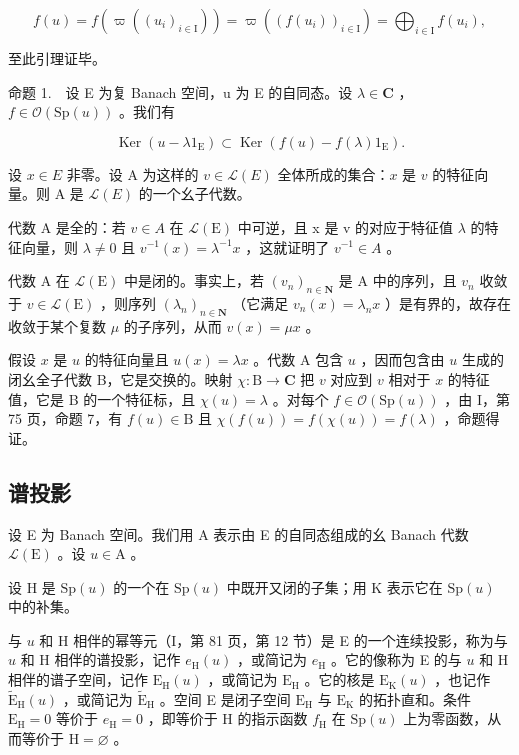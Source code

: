 \[
f (u) = f (\varpi ((u _ {i}) _ {i \in \mathrm{I}})) = \varpi ((f (u _ {i})) _ {i \in \mathrm{I}}) = \bigoplus_ {i \in \mathrm{I}} f (u _ {i}),
\]

至此引理证毕。

命题 1.　设 E 为复 Banach 空间，u 为 E 的自同态。设 \(\lambda \in \mathbf{C}\) ，\(f \in \mathcal{O}(\mathrm{Sp}(u))\) 。我们有

\[
\operatorname{Ker} (u - \lambda 1 _ {\mathrm{E}}) \subset \operatorname{Ker} (f (u) - f (\lambda) 1 _ {\mathrm{E}}).
\]

设 \(x \in E\) 非零。设 A 为这样的 \(v \in \mathcal{L}(E)\) 全体所成的集合：\(x\) 是 \(v\) 的特征向量。则 A 是 \(\mathcal{L}(E)\) 的一个幺子代数。

代数 A 是全的：若 \(v \in A\) 在 \(\mathcal{L}(\mathrm{E})\) 中可逆，且 x 是 v 的对应于特征值 \(\lambda\) 的特征向量，则 \(\lambda \neq 0\) 且 \(v^{-1}(x) = \lambda^{-1}x\) ，这就证明了 \(v^{-1} \in A\) 。

代数 A 在 \(\mathcal{L}(\mathrm{E})\) 中是闭的。事实上，若 \((v_n)_{n\in \mathbf{N}}\) 是 A 中的序列，且 \(v_{n}\) 收敛于 \(v\in \mathcal{L}(\mathrm{E})\) ，则序列 \((\lambda_{n})_{n\in \mathbf{N}}\) （它满足 \(v_{n}(x) = \lambda_{n}x\) ）是有界的，故存在收敛于某个复数 \(\mu\) 的子序列，从而 \(v(x) = \mu x\) 。

假设 \(x\) 是 \(u\) 的特征向量且 \(u(x) = \lambda x\) 。代数 A 包含 \(u\) ，因而包含由 \(u\) 生成的闭幺全子代数 B，它是交换的。映射 \(\chi \colon \mathrm{B} \to \mathbf{C}\) 把 \(v\) 对应到 \(v\) 相对于 \(x\) 的特征值，它是 B 的一个特征标，且 \(\chi(u) = \lambda\) 。对每个 \(f \in \mathcal{O}(\mathrm{Sp}(u))\) ，由 I，第 75 页，命题 7，有 \(f(u) \in \mathrm{B}\) 且 \(\chi(f(u)) = f(\chi(u)) = f(\lambda)\) ，命题得证。

\subsection{谱投影}

设 E 为 Banach 空间。我们用 A 表示由 E 的自同态组成的幺 Banach 代数 \(\mathcal{L}(\mathrm{E})\) 。设 \(u\in \mathrm{A}\) 。

设 H 是 \(\mathrm{Sp}(u)\) 的一个在 \(\mathrm{Sp}(u)\) 中既开又闭的子集；用 K 表示它在 \(\mathrm{Sp}(u)\) 中的补集。

与 \(u\) 和 H 相伴的幂等元（I，第 81 页，第 12 节）是 E 的一个连续投影，称为与 \(u\) 和 H 相伴的谱投影，记作 \(e_{\mathrm{H}}(u)\) ，或简记为 \(e_{\mathrm{H}}\) 。它的像称为 E 的与 \(u\) 和 H 相伴的谱子空间，记作 \(\mathrm{E_H}(u)\) ，或简记为 \(\mathrm{E_H}\) 。它的核是 \(\mathrm{E_K}(u)\) ，也记作 \(\widetilde{\mathrm{E}}_{\mathrm{H}}(u)\) ，或简记为 \(\widetilde{\mathrm{E}}_{\mathrm{H}}\) 。空间 E 是闭子空间 \(\mathrm{E_H}\) 与 \(\mathrm{E_K}\) 的拓扑直和。条件 \(\mathrm{E_H} = 0\) 等价于 \(e_{\mathrm{H}} = 0\) ，即等价于 H 的指示函数 \(f_{\mathrm{H}}\) 在 \(\mathrm{Sp}(u)\) 上为零函数，从而等价于 \(\mathrm{H} = \varnothing\) 。

